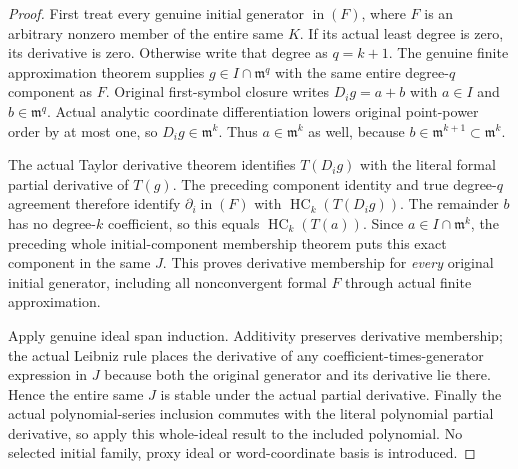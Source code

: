 \begin{proof}
First treat every genuine initial generator $\operatorname{in}(F)$,
where $F$ is an arbitrary nonzero member of the entire same $K$.
If its actual least degree is zero, its derivative is zero. Otherwise
write that degree as $q=k+1$. The genuine finite approximation theorem
supplies $g\in I\cap\mathfrak m^q$ with the same entire degree-$q$
component as $F$. Original first-symbol closure writes
$D_ig=a+b$ with $a\in I$ and $b\in\mathfrak m^q$. Actual analytic
coordinate differentiation lowers original point-power order by at
most one, so $D_ig\in\mathfrak m^k$. Thus $a\in\mathfrak m^k$ as
well, because $b\in\mathfrak m^{k+1}\subset\mathfrak m^k$.

The actual Taylor derivative theorem identifies $T(D_ig)$ with the
literal formal partial derivative of $T(g)$. The preceding component
identity and true degree-$q$ agreement therefore identify
$\partial_i\operatorname{in}(F)$ with
$\operatorname{HC}_k(T(D_ig))$. The remainder $b$ has no degree-$k$
coefficient, so this equals $\operatorname{HC}_k(T(a))$. Since
$a\in I\cap\mathfrak m^k$, the preceding whole initial-component
membership theorem puts this exact component in the same $J$.
This proves derivative membership for \emph{every} original initial
generator, including all nonconvergent formal $F$ through actual
finite approximation.

Apply genuine ideal span induction. Additivity preserves derivative
membership; the actual Leibniz rule places the derivative of any
coefficient-times-generator expression in $J$ because both the
original generator and its derivative lie there. Hence the entire
same $J$ is stable under the actual partial derivative. Finally the
actual polynomial-series inclusion commutes with the literal
polynomial partial derivative, so apply this whole-ideal result to
the included polynomial. No selected initial family, proxy ideal or
word-coordinate basis is introduced.
\end{proof}

